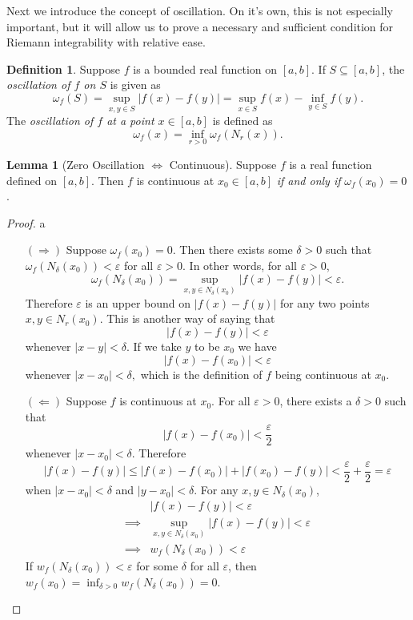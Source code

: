 \documentclass{article}
\newcommand{\abs}[1]{\left\lvert#1\right\rvert}
\theoremstyle{definition}
\newtheorem{lemma}{Lemma}[section]
\newtheorem{definition}{Definition}[section]
\begin{document}
	Next we introduce the concept of oscillation. On it's own, this is not especially important, but it will allow us to prove a necessary and sufficient condition for Riemann integrability with relative ease.
	\begin{definition}\label{def}
		Suppose $ f $ is a bounded real function on $ [a,b] $. If $ S\subseteq [a,b] $, the \textit{\color{red}oscillation of $ f $ on $ S $} is given as 
		$$ \omega_f(S)= \sup_{x,y\in S}\abs{f(x)-f(y)} = \sup_{x\in S} f(x) - \inf_{y\in S}f(y).$$ The \textit{\color{red}oscillation of $ f $ at a point $ x\in [a,b] $} is defined as 
		$$ \omega_f(x)=\inf_{r > 0}\omega_f\left(N_r(x)\right) .$$
	\end{definition} 
	\begin{lemma}[Zero Oscillation $ \iff $ Continuous]
		Suppose $ f $ is a real function defined on $ [a,b] $. Then $ f $ is continuous at $ x_0\in [a,b] $ \textit{if and only if} $ \omega_f(x_0)=0 $.
	\end{lemma} 
	\begin{proof}
		{\color{white}a}
		\begin{enumerate}
			\item [$ (\Longrightarrow) $] Suppose $ \omega_f(x_0)=0 $. Then there exists some $ \delta >0 $ such that $\omega_f(N_\delta(x_0))<\varepsilon $ for all $ \varepsilon > 0 $. In other words, for all $ \varepsilon >0 $, 
			$$ \omega_f(N_\delta(x_0)) = \sup_{x,y\in N_\delta(x_0)}\abs{f(x)-f(y)} <\varepsilon .$$ Therefore $ \varepsilon $ is an upper bound on $ \abs{f(x)-f(y)} $ for any two points $ {x,y\in N_r(x_0)} $. This is another way of saying that $$ \abs{f(x)-f(y)} <\varepsilon $$ whenever $ \abs{x-y}<\delta $. If we take $ y $ to be $ x_0 $ we have $$ \abs{f(x)-f(x_0)} <\varepsilon $$ whenever $ \abs{x-x_0}<\delta ,$ which is the definition of $ f $ being continuous at $ x_0 $. 
			\item [$ (\Longleftarrow) $] Suppose $ f $ is continuous at $ x_0 $. For all $ \varepsilon >0 $, there exists a $ \delta>0 $ such that 
			$$ \abs{f(x)-f(x_0)} <\frac{\varepsilon}{2} $$  whenever $  \abs{x-x_0}<\delta $. Therefore 
			$$ \abs{f(x)-f(y)} \le \abs{f(x)-f(x_0)} + \abs{f(x_0)-f(y)} < \frac{\varepsilon}{2} + \frac{\varepsilon}{2} = \varepsilon$$ when
			$\abs{x-x_0}<\delta $ and $ \abs{y-x_0}<\delta $. 
			For any $x,y\in N_\delta(x_0) $, 
			\begin{align*}
				&\abs{f(x)-f(y)} < \varepsilon \\
				\implies & \sup_{x,y\in N_\delta(x_0)}\abs{f(x)-f(y)} <\varepsilon \\ \implies & w_f(N_\delta(x_0))<\varepsilon 
			\end{align*}
			If $ w_f(N_\delta(x_0))<\varepsilon  $ for some $ \delta $ for all $ \varepsilon $, then $ w_f(x_0)=\inf_{\delta > 0}w_f(N_\delta(x_0))=0 $. 
		\end{enumerate}
	\end{proof}
\end{document}
